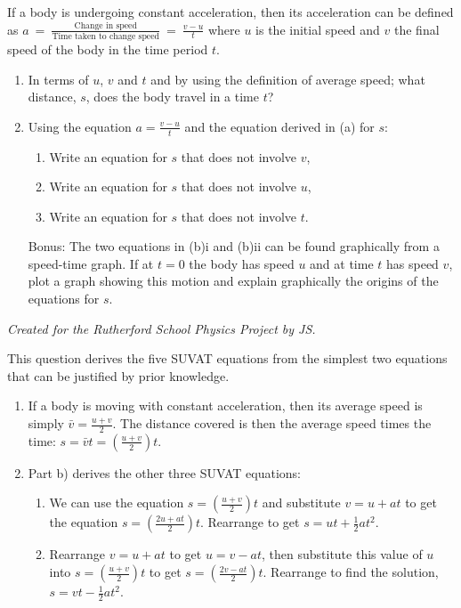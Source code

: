 \begin{problem}
{If a body is undergoing constant acceleration, then its acceleration can be defined as $a~=~\frac{\textrm{Change in speed}}{\textrm{Time taken to change speed}}~=~\frac{v - u}{t}$ where $u$ is the initial speed and $v$ the final speed of the body in the time period $t$.
\begin{enumerate}
	\item In terms of $u$, $v$ and $t$ and by using the definition of average speed; what distance, $s$, does the body travel in a time $t$?
	\item Using the equation $a = \frac{v - u}{t}$ and the equation derived in (a) for $s$:
	\begin{enumerate}
		\item Write an equation for $s$ that does not involve $v$,
		\item Write an equation for $s$ that does not involve $u$,
		\item Write an equation for $s$ that does not involve $t$.
	\end{enumerate}
	Bonus: The two equations in (b)i and (b)ii can be found graphically from a speed-time graph. If at $t = 0$ the body has speed $u$ and at time $t$ has speed $v$, plot a graph showing this motion and explain graphically the origins of the equations for $s$.
\end{enumerate}
}
{\textit{Created for the Rutherford School Physics Project by JS.}}
{This question derives the five SUVAT equations from the simplest two equations that can be justified by prior knowledge.
\begin{enumerate}
	\item If a body is moving with constant acceleration, then its average speed is simply $\bar{v} = \frac{u+v}{2}$. The distance covered is then the average speed times the time: $s = \bar{v}t = \left(\frac{u+v}{2}\right)t$.
	\item Part b) derives the other three SUVAT equations:
	\begin{enumerate}
		\item We can use the equation $s = \left(\frac{u + v}{2}\right)t$ and substitute $v = u + at$ to get the equation $s = \left(\frac{2u + at}{2}\right)t$. Rearrange to get $s = ut + \frac{1}{2}at^{2}$.
		\item Rearrange $v = u + at$ to get $u = v - at$, then substitute this value of $u$ into $s = \left(\frac{u + v}{2}\right)t$ to get $s = \left(\frac{2v - at}{2}\right)t$. Rearrange to find the solution, $s = vt - \frac{1}{2}at^{2}$.

\end{enumerate}
\end{enumerate}}
\end{problem}
